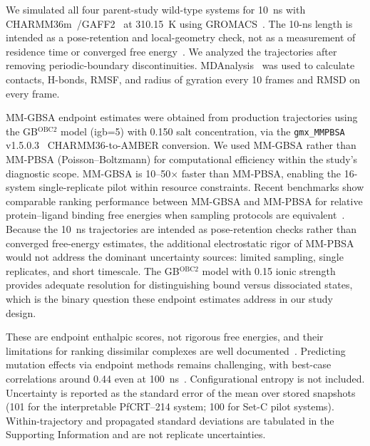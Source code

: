 \documentclass[journal=jcisd8,manuscript=article,layout=traditional]{achemso}
\begin{document}
We simulated all four parent-study wild-type systems for \qty{10}{\nano\second} with CHARMM36m~\citep{charmm36m_2017}/GAFF2~\citep{wang2004gaff} at \qty{310.15}{\kelvin} using GROMACS~\citep{gromacs_2015,lindahl_2024}. The 10-ns length is intended as a pose-retention and local-geometry check, not as a measurement of residence time or converged free energy~\citep{wei2024structure}. We analyzed the trajectories after removing periodic-boundary discontinuities. MDAnalysis~\citep{mdanalysis_2011} was used to calculate contacts, H-bonds, RMSF, and radius of gyration every \num{10} frames and RMSD on every frame.

MM-GBSA endpoint estimates were obtained from production trajectories using the GB$^{\text{OBC2}}$ model (igb=5) with \qty{0.150}{\molar} salt concentration, via the \texttt{gmx\_MMPBSA} v1.5.0.3~\citep{gmx_mmpbsa_2021} CHARMM36-to-AMBER conversion. We used MM-GBSA rather than MM-PBSA (Poisson--Boltzmann) for computational efficiency within the study's diagnostic scope. MM-GBSA is 10--50$\times$ faster than MM-PBSA, enabling the 16-system single-replicate pilot within resource constraints. Recent benchmarks show comparable ranking performance between MM-GBSA and MM-PBSA for relative protein--ligand binding free energies when sampling protocols are equivalent~\citep{genheden2015mmpbsa,wang2019_mmgbsa}. Because the \qty{10}{\nano\second} trajectories are intended as pose-retention checks rather than converged free-energy estimates, the additional electrostatic rigor of MM-PBSA would not address the dominant uncertainty sources: limited sampling, single replicates, and short timescale. The GB$^{\text{OBC2}}$ model with \qty{0.15}{\molar} ionic strength provides adequate resolution for distinguishing bound versus dissociated states, which is the binary question these endpoint estimates address in our study design.

These are endpoint enthalpic scores, not rigorous free energies, and their limitations for ranking dissimilar complexes are well documented~\citep{roux2024mmgbsa,genheden2015mmpbsa}. Predicting mutation effects via endpoint methods remains challenging, with best-case correlations around 0.44 even at 100~ns~\citep{yu2022mutation_mmgbsa}. Configurational entropy is not included. Uncertainty is reported as the standard error of the mean over stored snapshots (\num{101} for the interpretable PfCRT--214 system; \num{100} for Set-C pilot systems). Within-trajectory and propagated standard deviations are tabulated in the Supporting Information and are not replicate uncertainties.
\end{document}
